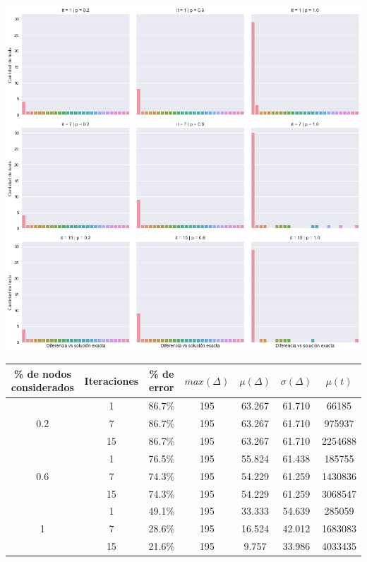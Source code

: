 \begin{center}
    \includegraphics[scale=0.6]{img/path-grasp2-3x3.png}
    
    \begin{tabular}{ | c | c | c | c | c | c | c |}
        \hline
        \% de nodos considerados & Iteraciones & \% de error & $max(\Delta)$ & $\mu(\Delta)$ & $\sigma(\Delta)$ & $\mu(t)$ \\ \hline
            & 1  & 86.7\% & 195 & 63.267 & 61.710 &   66185 \\ \cline{2-7}
        0.2 & 7  & 86.7\% & 195 & 63.267 & 61.710 &  975937 \\ \cline{2-7}
            & 15 & 86.7\% & 195 & 63.267 & 61.710 & 2254688 \\ \hline
            & 1  & 76.5\% & 195 & 55.824 & 61.438 &  185755 \\ \cline{2-7}
        0.6 & 7  & 74.3\% & 195 & 54.229 & 61.259 & 1430836 \\ \cline{2-7}
            & 15 & 74.3\% & 195 & 54.229 & 61.259 & 3068547 \\ \hline
            & 1  & 49.1\% & 195 & 33.333 & 54.639 &  285059 \\ \cline{2-7}
        1   & 7  & 28.6\% & 195 & 16.524 & 42.012 & 1683083 \\ \cline{2-7}
            & 15 & 21.6\% & 195 &  9.757 & 33.986 & 4033435 \\
        \hline
    \end{tabular}
\end{center}


